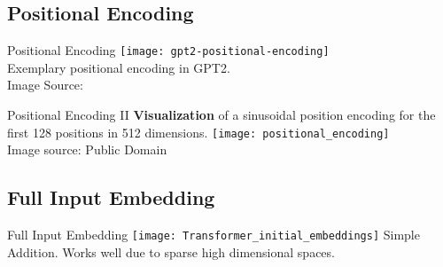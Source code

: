 \subsection{Positional Encoding}

\begin{frame}[c]{Positional Encoding}
    \texttt{[image: gpt2-positional-encoding]} \\
    \large
    Exemplary positional encoding in GPT2. \\
    \normalsize
    Image Source: \cite{alammar_illustrated_2019}
\end{frame}

\begin{frame}[c]{Positional Encoding II}
    \large
    \textbf{Visualization} of a sinusoidal position encoding for the first 128 positions in 512 dimensions.
    \newline
    \newline
    \texttt{[image: positional\_encoding]} \\
    \normalsize
    Image source: Public Domain
\end{frame}

\subsection{Full Input Embedding}
\begin{frame}[c]{Full Input Embedding}
    \texttt{[image: Transformer\_initial\_embeddings]}
    \large
    Simple Addition. Works well due to sparse high dimensional spaces.
\end{frame}


